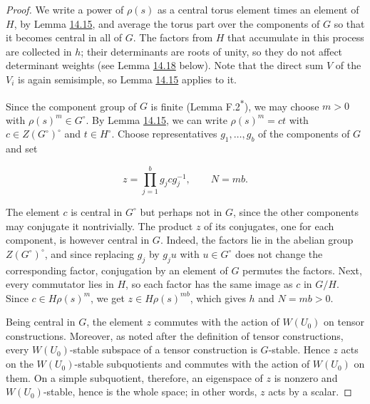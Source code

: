 \documentclass[11pt]{article}
\newcommand{\bpout}[1]{#1\textsuperscript{\hyperlink{bp-outside}{\ensuremath{\ast}}}}
\begin{document}
\begin{proof}[{Proof}]\label{bp93}%
We write a power of \(\rho(s)\) as a central torus element times an element of \(H\), by Lemma \hyperref[bp87]{14.15}, and average the torus part over the components of \(G\) so that it becomes central in all of \(G\). The factors from \(H\) that accumulate in this process are collected in \(h\); their determinants are roots of unity, so they do not affect determinant weights (see Lemma \hyperref[bp96]{14.18} below). Note that the direct sum \(V\) of the \(V_i\) is again semisimple, so Lemma \hyperref[bp87]{14.15} applies to it.

Since the component group of \(G\) is finite (Lemma \bpout{F.2}), we may choose \(m>0\) with \(\rho(s)^m\in G^\circ\). By Lemma \hyperref[bp87]{14.15}, we can write \(\rho(s)^m=ct\) with \(c\in Z(G^\circ)^\circ\) and \(t\in H^\circ\). Choose representatives \(g_1,\ldots,g_b\) of the components of \(G\) and set

\[
z=\prod_{j=1}^bg_jcg_j^{-1},\qquad N=mb.
\]

The element \(c\) is central in \(G^\circ\) but perhaps not in \(G\), since the other components may conjugate it nontrivially. The product \(z\) of its conjugates, one for each component, is however central in \(G\). Indeed, the factors lie in the abelian group \(Z(G^\circ)^\circ\), and since replacing \(g_j\) by \(g_ju\) with \(u\in G^\circ\) does not change the corresponding factor, conjugation by an element of \(G\) permutes the factors. Next, every commutator lies in \(H\), so each factor has the same image as \(c\) in \(G/H\). Since \(c\in H\rho(s)^m\), we get \(z\in H\rho(s)^{mb}\), which gives \(h\) and \(N=mb>0\).

Being central in \(G\), the element \(z\) commutes with the action of \(W(U_0)\) on tensor constructions. Moreover, as noted after the definition of tensor constructions, every \(W(U_0)\)-stable subspace of a tensor construction is \(G\)-stable. Hence \(z\) acts on the \(W(U_0)\)-stable subquotients and commutes with the action of \(W(U_0)\) on them. On a simple subquotient, therefore, an eigenspace of \(z\) is nonzero and \(W(U_0)\)-stable, hence is the whole space; in other words, \(z\) acts by a scalar.
\end{proof}


\end{document}

